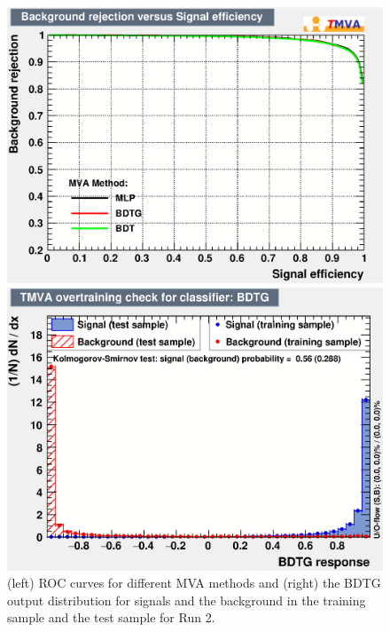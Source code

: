 \begin{figure}[!tbp]
\begin{minipage}[t]{0.48\textwidth}
\centering
\includegraphics[width=1.0\textwidth]{Figures/03_Zcs/04_Selection/rejBvsS_run2}
\end{minipage}
\begin{minipage}[t]{0.48\textwidth}
\centering
\includegraphics[width=1.0\textwidth]{Figures/03_Zcs/04_Selection/overtrain_BDTG_run2}
\end{minipage}
\caption{ 
 (left) ROC curves for different MVA methods and (right) the BDTG output distribution for signals and the background in the training sample and the test sample for Run 2.} 
\label{fig:MVAMonitor_run2}
\end{figure}

